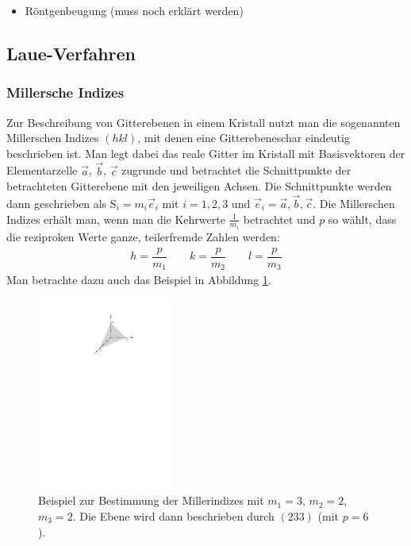 \documentclass[11pt, a4paper]{article}
\begin{document}
\begin{itemize}
  \item Röntgenbeugung (muss noch erklärt werden)
\end{itemize}

\subsection{Laue-Verfahren}

\subsubsection{Millersche Indizes}

Zur Beschreibung von Gitterebenen in einem Kristall nutzt man die sogenannten Millerschen Indizes $(hkl)$, mit denen eine Gitterebeneschar eindeutig beschrieben ist.
Man legt dabei das reale Gitter im Kristall mit Basisvektoren der Elementarzelle $\vec{a}$, $\vec{b}$, $\vec{c}$ zugrunde und betrachtet die Schnittpunkte der betrachteten Gitterebene mit den jeweiligen Achsen.
Die Schnittpunkte werden dann geschrieben als S$_i=m_i\vec{e}_i$ mit $i=1,2,3$ und $\vec{e}_i= \vec{a}, \vec{b}, \vec{c}$.
Die Millerschen Indizes erhält man, wenn man die Kehrwerte $\frac{1}{m_i}$ betrachtet und $p$ so wählt, dass die reziproken Werte ganze, teilerfremde Zahlen werden\cite{demtroeder}:
\begin{align}
h=\dfrac{p}{m_1} \quad\quad k=\dfrac{p}{m_2} \quad\quad l=\dfrac{p}{m_3}
\end{align}
Man betrachte dazu auch das Beispiel in Abbildung \ref{fig:millerindizes}.
\begin{figure}[h]
\centering
\includegraphics[width=0.4\textwidth]{./grafiken/millerindizes.pdf}
\caption{Beispiel zur Bestimmung der Millerindizes mit $m_1=3$, $m_2=2$, $m_3=2$. Die Ebene wird dann beschrieben durch $(233)$ (mit $p=6$).}
\label{fig:millerindizes}
\end{figure}
\end{document}
